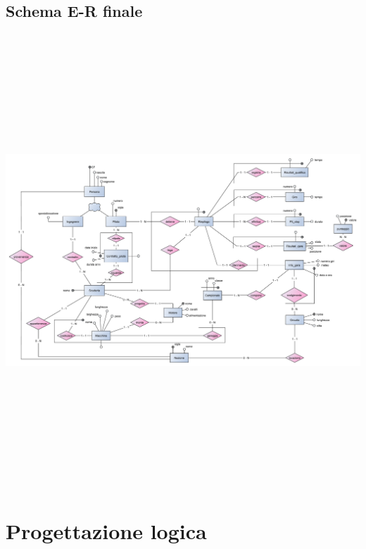\documentclass[a4paper,12pt]{report}
\begin{document}
		\section{Schema E-R finale}
		\begin{center}
				\hspace*{-2cm}%
				\includegraphics[width=\dimexpr\textwidth+6cm\relax, height=17cm, angle=90]{copies/ERfinale.pdf}%
				\hspace*{-8cm}%
			\end{center}
		\pagebreak

	\chapter{Progettazione logica}
\end{document}
